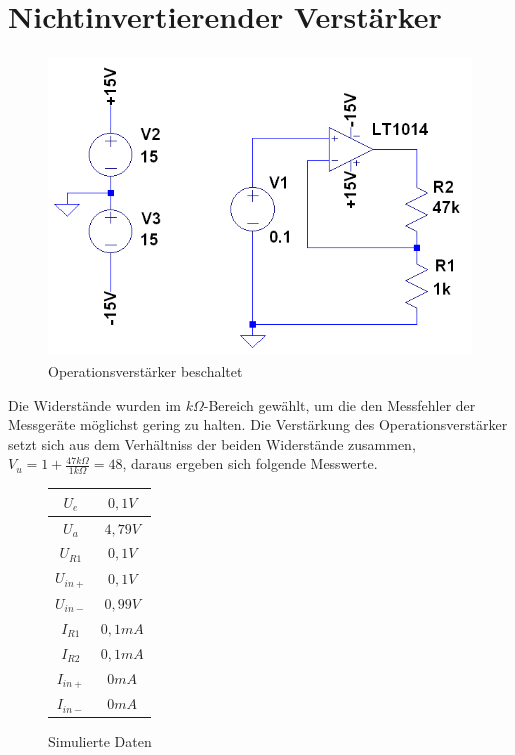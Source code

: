 
\section{Nichtinvertierender Verst\"arker}

\begin{figure}[H]
 \centering
 \includegraphics[height=8cm,width=12cm]{Simulationen/OPV}
 \caption{Operationsverstärker beschaltet}
\end{figure}

Die Widerstände wurden im $k\Omega$-Bereich gewählt, um die den Messfehler der Messgeräte möglichst gering zu halten. Die Verstärkung des Operationsverstärker setzt
sich aus dem Verhältniss der beiden Widerstände zusammen, $V_u=1+\frac{47k\Omega}{1k\Omega}=48$, daraus ergeben sich folgende Messwerte.\\

\begin{figure}[H]
 \centering
 \begin{tabular}{c|c}
 $U_e$ 		& $0,1V$ 	\\ \hline
 $U_a$ 		& $4,79V$ 	\\ \hline
 $U_{R1}$ 	& $0,1V$ 	\\ \hline
 $U_{in+}$	& $0,1V$ 	\\ \hline
 $U_{in-}$ 	& $0,99V$ 	\\ \hline
 $I_{R1}$ 	& $0,1mA$ 	\\ \hline
 $I_{R2}$ 	& $0,1mA$ 	\\ \hline
 $I_{in+}$ 	& $0mA$ 	\\ \hline
 $I_{in-}$ 	& $0mA$ 	\\ \hline
 \end{tabular}
 \caption{Simulierte Daten}
\end{figure}

